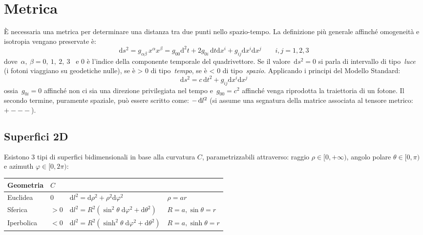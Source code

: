 \section{Metrica}\label{1:sec1metrica}

È necessaria una metrica per determinare una distanza tra due punti nello spazio-tempo. La definizione più generale affinché omogeneità e isotropia vengano preservate è:
\begin{equation}    
    \mathrm{d}s^2 = g_{\alpha \beta}\, x^\alpha x^\beta
  = g_{00}\mathrm{d}^2t+2g_{0i}\, \mathrm{d}t\mathrm{d}x^i+g_{ij}\mathrm{d}x^i\mathrm{d}x^j \qquad i,j=1,2,3
\end{equation}
dove~\(\alpha,\ \beta=0,\ 1,\ 2,\ 3\)~ e 0 è l'indice della componente temporale del
quadrivettore. Se il valore~\(\mathrm{d}s^2  = 0\) si parla di intervallo di
tipo~\emph{luce~} (i fotoni viaggiano su geodetiche nulle), se è
\textgreater{} 0 di tipo~\emph{tempo}, se è \textless{} 0 di
tipo~\emph{spazio}. Applicando i principi del Modello Standard:
\begin{equation}    
    \mathrm{d}s^2 = c \, \mathrm{d}t^2+g_{ij}\mathrm{d}x^i\mathrm{d}x^j
\end{equation}
ossia~\(g_{0i}=0\) affinché non ci sia una direzione privilegiata
nel tempo e~\(g_{00}=c^2\) affinché venga riprodotta
la traiettoria di un fotone. Il secondo termine, puramente spaziale, può essere scritto come: $-\operatorname{d}\!{l^2}$ (si assume una segnatura della matrice associata al tensore metrico: $+---$).

\par\null

\subsection{Superfici 2D}
Esistono 3 tipi di superfici bidimensionali in base alla curvatura $C$, parametrizzabili attraverso: raggio $\rho\in [0,+\infty)$, angolo polare $\theta\in [0,\pi)$ e azimuth $\varphi\in [0, 2\pi)$:

\vspace{1em}
\noindent\begin{tabular}{l |  l | l | l}
Geometria & $C$ & \\
\hline 
Euclidea & $0$  & $\mathrm{d}l^2=\mathrm{d}\rho^2+\rho^2\mathrm{d}\varphi^2$ & $\rho = ar$ \\
Sferica & $>0$ & $\mathrm{d}l^2=R^2(\sin^2\theta\; \mathrm{d}\varphi^2+\mathrm{d}\theta^2)$ & $R=a, \sin\theta =r $  \\
Iperbolica & $<0$ & $\mathrm{d}l^2=R^2(\sinh^2\theta\; \mathrm{d}\varphi^2+\mathrm{d}\theta^2) $ & $R=a, \sinh\theta =r $ \\
\end{tabular}

